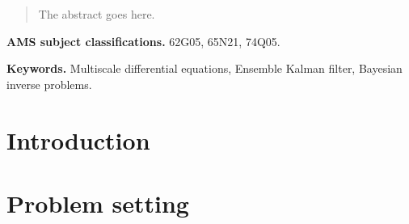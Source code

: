 \documentclass[10pt]{article}
\begin{document}
\maketitle	

\begin{abstract} The abstract goes here.
\end{abstract}	

\textbf{AMS subject classifications.} 62G05, 65N21, 74Q05.

\textbf{Keywords.} Multiscale differential equations, Ensemble Kalman filter, Bayesian inverse problems.

\section{Introduction}

\section{Problem setting}

\cite{Abd02}



\end{document}
